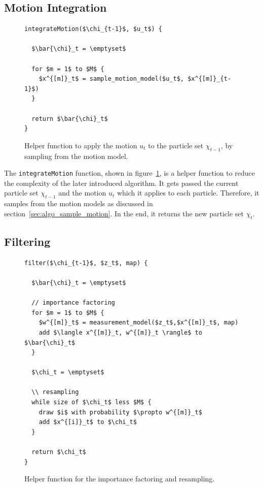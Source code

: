 \subsection{Motion Integration}

\begin{figure}
\begin{lstlisting}[mathescape]
integrateMotion($\chi_{t-1}$, $u_t$) {

  $\bar{\chi}_t = \emptyset$

  for $m = 1$ to $M$ {
    $x^{[m]}_t$ = sample_motion_model($u_t$, $x^{[m]}_{t-1}$)
  }
  
  return $\bar{\chi}_t$
}		
\end{lstlisting}
\caption{Helper function to apply the motion $u_t$ to the particle set $\chi_{t-1}$, by sampling from the motion model.}
\label{lst:pf_integrateMotion}
\end{figure}

The \texttt{integrateMotion} function, shown in figure~\ref{lst:pf_integrateMotion}, is a helper function to reduce the complexity of the later introduced algorithm. It gets passed the current particle set $\chi_{t-1}$ and the motion $u_t$ which it applies to each particle. Therefore, it samples from the motion models as discussed in section~\ref{sec:algo_sample_motion}. In the end, it returns the new particle set $\chi_t$.


\subsection{Filtering}

\begin{figure}
\begin{lstlisting}[mathescape]
filter($\chi_{t-1}$, $z_t$, map) {
  
  $\bar{\chi}_t = \emptyset$

  // importance factoring
  for $m = 1$ to $M$ {
    $w^{[m]}_t$ = measurement_model($z_t$,$x^{[m]}_t$, map)
    add $\langle x^{[m]}_t, w^{[m]}_t \rangle$ to $\bar{\chi}_t$
  }
  
  $\chi_t = \emptyset$
  
  \\ resampling
  while size of $\chi_t$ less $M$ {
    draw $i$ with probability $\propto w^{[m]}_t$
    add $x^{[i]}_t$ to $\chi_t$
  }
  
  return $\chi_t$
}		
\end{lstlisting}
\caption{Helper function for the importance factoring and resampling.}
\label{lst:pf_filter}
\end{figure}

